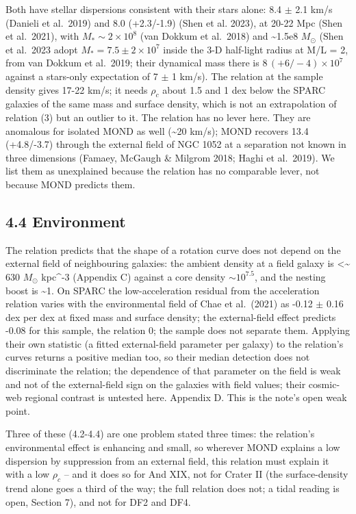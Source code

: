 \documentclass[
  10pt,
]{article}
\begin{document}
Both have stellar dispersions consistent with
their stars alone: 8.4 $\pm$ 2.1 km/s (Danieli et al.~2019) and 8.0
(+2.3/-1.9) (Shen et al. 2023), at 20-22 Mpc (Shen et al.~2021), with
$M_*\sim 2\times10^8$ (van Dokkum et al.~2018) and
\textasciitilde{}1.5e8 $M_\odot$ (Shen et al.~2023 adopt $M_*=7.5\pm2\times10^7$ inside the 3-D half-light radius at M/L = 2, from van Dokkum et
al.~2019; their dynamical mass there is $8\,(+6/-4)\times10^7$ against a
stars-only expectation of 7 $\pm$ 1 km/s). The relation at the sample density gives 17-22 km/s; it
needs $\rho_c$ about 1.5 and 1 dex below the SPARC galaxies of the same
mass and surface density, which is not an extrapolation of relation (3)
but an outlier to it. The relation has no lever here. They are anomalous for
isolated MOND as well (\textasciitilde{}20 km/s); MOND recovers 13.4
(+4.8/-3.7) through the external field of NGC 1052 at a separation not
known in three dimensions (Famaey, McGaugh \& Milgrom 2018; Haghi et
al.~2019). We list them as unexplained because the relation has no comparable
lever, not because MOND predicts them.

\subsection{4.4 Environment}

The relation predicts that the shape of a rotation curve
does not depend on the external field of neighbouring galaxies: the ambient density at a field galaxy is \textless{}\textasciitilde{} 630 $M_\odot$ kpc\^{}-3 (Appendix C) against a core density
$\sim 10^{7.5}$, and the nesting boost is \textasciitilde{}1. On SPARC the low-acceleration residual from the
acceleration relation varies with the environmental field of Chae et
al.~(2021) as -0.12 $\pm$ 0.16 dex per dex at fixed mass and surface
density; the external-field effect predicts -0.08 for this sample, the
relation 0; the sample does not separate them. Applying their own statistic
(a fitted external-field parameter per galaxy) to the relation's curves
returns a positive median too, so their median detection does not
discriminate the relation; the dependence of that parameter on the field is
weak and not of the external-field sign on the galaxies with field
values; their cosmic-web regional contrast is untested here. Appendix D.
This is the note's open weak point.

Three of these (4.2-4.4) are one problem stated three times: the relation's
environmental effect is enhancing and small, so wherever MOND explains a
low dispersion by suppression from an external field, this relation must
explain it with a low $\rho_c$ -- and it does so for And XIX, not for
Crater II (the surface-density trend alone goes a third of the way; the full relation does not; a tidal reading is open, Section 7), and not for DF2 and DF4.
\end{document}
